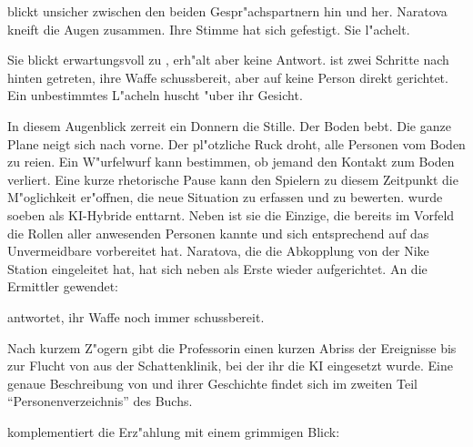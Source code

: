 
\ml{} blickt unsicher zwischen den beiden Gespr"achspartnern hin und her. Naratova kneift die Augen zusammen. Ihre Stimme hat sich gefestigt. Sie l"achelt.


Sie blickt erwartungsvoll zu \xl{}, erh"alt aber keine Antwort. \xl{} ist zwei Schritte nach hinten getreten, ihre Waffe schussbereit, aber auf keine Person direkt gerichtet. Ein unbestimmtes L"acheln huscht "uber ihr Gesicht.

In diesem Augenblick zerrei\3t ein Donnern die Stille. Der Boden bebt. Die ganze Plane neigt sich nach vorne. Der pl"otzliche Ruck droht, alle Personen vom Boden zu rei\3en. Ein W"urfelwurf kann bestimmen, ob jemand den Kontakt zum Boden verliert. Eine kurze rhetorische Pause kann den Spielern zu diesem Zeitpunkt die M"oglichkeit er"offnen, die neue Situation zu erfassen und zu bewerten. \xl{} wurde soeben als KI-Hybride enttarnt. Neben \ml{} ist sie die Einzige, die bereits im Vorfeld die Rollen aller anwesenden Personen kannte und sich entsprechend auf das Unvermeidbare vorbereitet hat. Naratova, die die Abkopplung von der Nike Station eingeleitet hat, hat sich neben \xl{} als Erste wieder aufgerichtet. An die Ermittler gewendet:


\xl{} antwortet, ihr Waffe noch immer schussbereit.


Nach kurzem Z"ogern gibt die Professorin einen kurzen Abriss der Ereignisse bis zur Flucht von \xl{} aus der Schattenklinik, bei der ihr die KI eingesetzt wurde. Eine genaue Beschreibung von \xl{} und ihrer Geschichte findet sich im zweiten Teil "`Personenverzeichnis"' des Buchs.

\xl{} komplementiert die Erz"ahlung mit einem grimmigen Blick:


